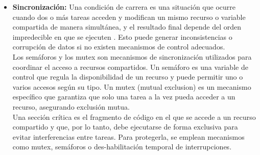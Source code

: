 \begin{itemize}
    La multitarea real ocurre cuando varias tareas se ejecutan simultáneamente en diferentes núcleos de procesamiento. En cambio, la multitarea simulada se presenta en sistemas con un solo núcleo, donde el procesador alterna rápidamente entre tareas mediante un scheduler, dando la impresión de ejecución simultánea aunque solo una tarea se ejecuta en cada instante.\\
    En sistemas embebidos, ejemplos de multitarea incluyen: un microcontrolador que controla un motor mientras lee sensores y transmite datos por comunicación serial; un sistema IoT (\textit{Internet of Things}) que adquiere datos, los procesa y los envía a la nube; o un dispositivo médico que monitorea señales mientras actualiza una pantalla. En todos estos casos, las tareas comparten el procesador y requieren coordinación adecuada. \cite{valvano2011embedded}
     \vspace{0.3cm}
    \item \textbf{Sincronización: } Una condición de carrera es una situación que ocurre cuando dos o más tareas acceden y modifican un mismo recurso o variable compartida de manera simultánea, y el resultado final depende del orden impredecible en que se ejecuten \cite{buttazzo1997hard}. Esto puede generar inconsistencias o corrupción de datos si no existen mecanismos de control adecuados.\\
    Los semáforos y los mutex son mecanismos de sincronización utilizados para coordinar el acceso a recursos compartidos. Un semáforo es una variable de control que regula la disponibilidad de un recurso y puede permitir uno o varios accesos según su tipo. Un mutex (mutual exclusion) es un mecanismo específico que garantiza que solo una tarea a la vez pueda acceder a un recurso, asegurando exclusión mutua.\\
    Una sección crítica es el fragmento de código en el que se accede a un recurso compartido y que, por lo tanto, debe ejecutarse de forma exclusiva para evitar interferencias entre tareas. Para protegerla, se emplean mecanismos como mutex, semáforos o des-habilitación temporal de interrupciones. \cite{valvano2011embedded}
\end{itemize}



